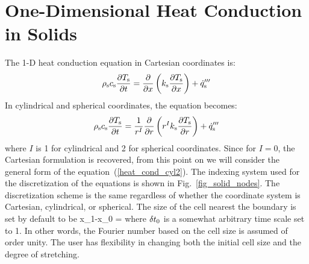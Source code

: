 \section{One-Dimensional Heat Conduction in Solids}

The 1-D heat conduction equation in Cartesian coordinates is:
\begin{equation}
\label{heat_cond_cart}
     \rho_{\rm s} c_{\rm s} \frac{\partial T_{\rm s}}{\partial t} = \frac{\partial}{\partial x} \left( k_{\rm s} \frac{\partial T_{\rm s}}{\partial x} \right) + \dot{q}'''_{\rm s}
\end{equation}
In cylindrical and spherical coordinates, the equation becomes:
\begin{equation}
\label{heat_cond_cyl2}
     \rho_{\rm s} c_{\rm s} \frac{\partial T_{\rm s}}{\partial t} = \frac{1}{r^I}\frac{\partial}{\partial r} \left( r^I k_{\rm s} \frac{\partial T_{\rm s}}{\partial r} \right) + \dot{q}'''_{\rm s}
\end{equation}
where $I$ is 1 for cylindrical and 2 for spherical coordinates. Since for $I=0$, the Cartesian formulation is recovered, from this point on we will consider the general form of the equation~(\ref{heat_cond_cyl2}). The indexing system used for the discretization of the equations is shown in Fig.~\ref{fig_solid_nodes}. The discretization scheme is the same regardless of whether the coordinate system is Cartesian, cylindrical, or spherical. The size of the cell nearest the boundary is set by default to be
\be
\label{eq:dx1dcond}
   x_1-x_0 = 
\ee
where $\delta t_0$ is a somewhat arbitrary time scale set to 1. In other words, the Fourier number based on the cell size is assumed of order unity. The user has flexibility in changing both the initial cell size and the degree of stretching.


